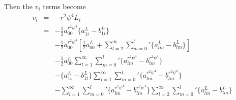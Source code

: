 \documentclass[11pt]{article}
\begin{document}
\noindent
Then the $v_i$ terms become
\begin{eqnarray}
v_i &=& -r^2 \psi^4 L_i \\ \nonumber
&=& -\frac{1}{2} a_{00}^{r^2 \psi^4} \{ a_{1i}^{L}-b_{1i}^{L} \} \\ \nonumber
&&-\frac{1}{2}a_{00}^{r^2\psi^4} \left[ \frac{1}{2}a_{00}^{L}+\sum_{l=2}^{\infty}{\sum_{m=0}^l}' \{ a_{lm}^{L}-b_{lm}^{L}\} \right] \\
&&-\frac{1}{2}a_{00}^{L}\sum_{l=1}^{\infty}{\sum_{m=0}^l}' \{ a_{lm}^{r^2 \psi^4}-b_{lm}^{r^2 \psi^4}\} \\ \nonumber
&& -\{ a_{1i}^{L}-b_{1i}^{L} \} \sum_{l=1}^{\infty}{\sum_{m=0}^l}' \{ a_{lm}^{r^2 \psi^4}-b_{lm}^{r^2 \psi^4}\} \\ \nonumber
&& -\sum_{l=1}^{\infty}{\sum_{m=0}^l}' \{ a_{lm}^{r^2 \psi^4}-b_{lm}^{r^2 \psi^4}\} 
        \sum_{l=2}^{\infty}{\sum_{m=0}^l}' \{ a_{lm}^{L}-b_{lm}^{L}\}
\end{eqnarray}
\end{document}
